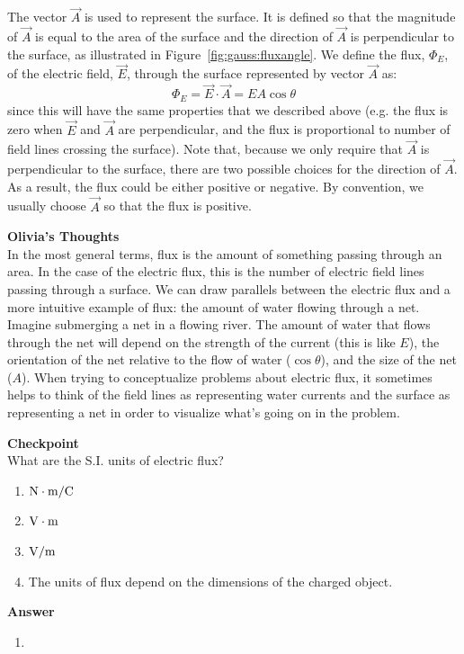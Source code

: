 The vector $\vec A$ is used to represent the surface. It is defined so that the magnitude of $\vec A$ is equal to the area of the surface and the direction of $\vec A$ is perpendicular to the surface, as illustrated in Figure~\ref{fig:gauss:fluxangle}. We define the flux, $\Phi_E$, of the electric field, $\vec E$, through the surface represented by vector $\vec A$ as:
\begin{equation}
\Phi_E=\vec E\cdot \vec A=EA\cos\theta
\end{equation}
since this will have the same properties that we described above (e.g. the flux is zero when $\vec E$ and $\vec A$ are perpendicular, and the flux is proportional to number of field lines crossing the surface). Note that, because we only require that $\vec A$ is perpendicular to the surface, there are two possible choices for the direction of $\vec A$. As a result, the flux could be either positive or negative. By convention, we usually choose $\vec A$ so that the flux is positive.

\begin{framed}
\textbf{Olivia's Thoughts}\\
In the most general terms, flux is the amount of something passing through an area. In the case of the electric flux, this is the number of electric field lines passing through a surface. We can draw parallels between the electric flux and a more intuitive example of flux: the amount of water flowing through a net. Imagine submerging a net in a flowing river. The amount of water that flows through the net will depend on the strength of the current (this is like $E$), the orientation of the net relative to the flow of water ($\cos\theta$), and the size of the net ($A$). When trying to conceptualize problems about electric flux, it sometimes helps to think of the field lines as representing water currents and the surface as representing a net in order to visualize what's going on in the problem.
\end{framed}

\begin{framed}
\textbf{Checkpoint}\\
What are the S.I. units of electric flux?

\begin{enumerate}
\item ${\rm N\cdot m/C}$
\item ${\rm V\cdot m}$
\item ${\rm V/m}$
\item The units of flux depend on the dimensions of the charged object.
\end{enumerate}

\begin{framed}
\textbf{Answer}\\
\begin{enumerate}[resume]
\item
\end{enumerate}
\end{framed}
\end{framed}

